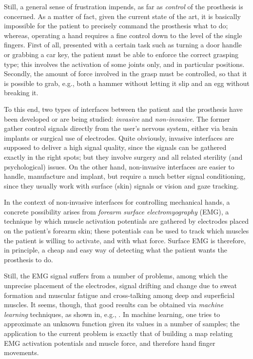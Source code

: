 Still, a general sense of frustration impends, as far as
\emph{control} of the prosthesis is concerned. As a matter of fact,
given the current state of the art, it is basically impossible for the
patient to precisely command the prosthesis what to do; whereas,
operating a hand requires a fine control down to the level of the
single fingers. First of all, presented with a certain task such as
turning a door handle or grabbing a car key, the patient must be able
to enforce the correct grasping type; this involves the activation of
some joints only, and in particular positions. Secondly, the amount of
force involved in the grasp must be controlled, so that it is possible
to grab, e.g., both a hammer without letting it slip and an egg
without breaking it.

To this end, two types of interfaces between the patient and the
prosthesis have been developed or are being studied: \emph{invasive}
and \emph{non-invasive}. The former gather control signals directly
from the user's nervous system, either via brain implants or surgical
use of electrodes. Quite obviously, invasive interfaces are supposed
to deliver a high signal quality, since the signals can be gathered
exactly in the right spots; but they involve surgery and all related
sterility (and psychological) issues. On the other hand, non-invasive
interfaces are easier to handle, manufacture and implant, but require
a much better signal conditioning, since they usually work with
surface (skin) signals or vision and gaze tracking.

In the context of non-invasive interfaces for controlling mechanical
hands, a concrete possibility arises from \emph{forearm surface
electromyography} (EMG), a technique by which muscle
activation potentials are gathered by electrodes placed on the
patient's forearm skin; these potentials can be used to track which
muscles the patient is willing to activate, and with what force.
Surface EMG is therefore, in principle, a cheap and easy way of
detecting what the patient wants the prosthesis to do.

Still, the EMG signal suffers from a number of problems, among which
the unprecise placement of the electrodes, signal drifting and change
due to sweat formation and muscular fatigue and cross-talking among
deep and superficial muscles. It seems, though, that good results can
be obtained via \emph{machine learning} techniques, as shown in, e.g.,
\cite{smagt}. In machine learning, one tries to approximate an unknown
function given its values in a number of samples; the application to
the current problem is exactly that of building a map relating EMG
activation potentials and muscle force, and therefore hand finger
movements.

